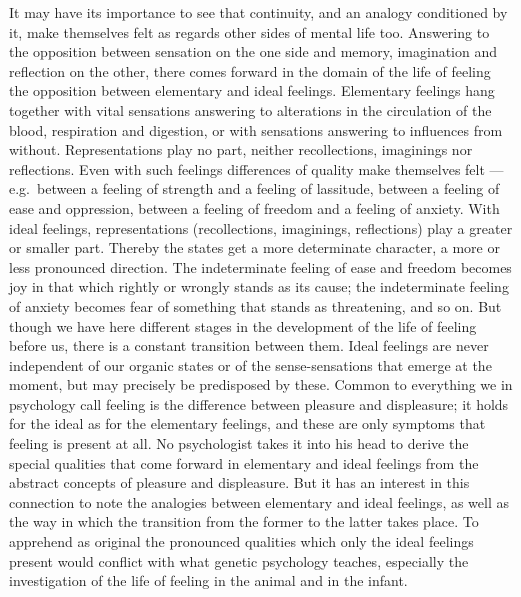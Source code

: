 \documentclass[12pt]{book}
\newcommand{\opage}[1]{\marginnote{\footnotesize\textit{[#1]}}}
\begin{document}
It may have its importance to see that continuity, and an analogy conditioned by
it, make themselves felt as regards other sides of mental life too. Answering to
the \opage{64}opposition between sensation on the one side and memory, imagination and
reflection on the other, there comes forward in the domain of the life of
feeling the opposition between elementary and ideal feelings. Elementary
feelings hang together with vital sensations answering to alterations in the
circulation of the blood, respiration and digestion, or with sensations
answering to influences from without. Representations play no part, neither
recollections, imaginings nor reflections. Even with such feelings differences
of quality make themselves felt --- e.g.\ between a feeling of strength and a
feeling of lassitude, between a feeling of ease and oppression, between a feeling
of freedom and a feeling of anxiety. With ideal feelings, representations
(recollections, imaginings, reflections) play a greater or smaller part.
Thereby the states get a more determinate character, a more or less pronounced
direction. The indeterminate feeling of ease and freedom becomes joy in that
which rightly or wrongly stands as its cause; the indeterminate feeling of
anxiety becomes fear of something that stands as threatening, and so on. But
though we have here different stages in the development of the life of feeling
before us, there is a constant transition between them. Ideal feelings are never
independent of our organic states or of the sense-sensations that emerge at the
moment, but may precisely be predisposed by these. Common to everything we in
psychology call feeling is the difference between pleasure and displeasure; it
holds for the ideal as for the elementary feelings, and these are only symptoms
that feeling is present at all. No psychologist takes it into his head to derive
the special qualities that come forward in elementary and ideal feelings from
the abstract concepts of pleasure and displeasure. But it has an interest in this
connection to \opage{65}note the analogies between elementary and ideal feelings, as well
as the way in which the transition from the former to the latter takes place. To
apprehend as original the pronounced qualities which only the ideal feelings
present would conflict with what genetic psychology teaches, especially the
investigation of the life of feeling in the animal and in the infant.
\end{document}
